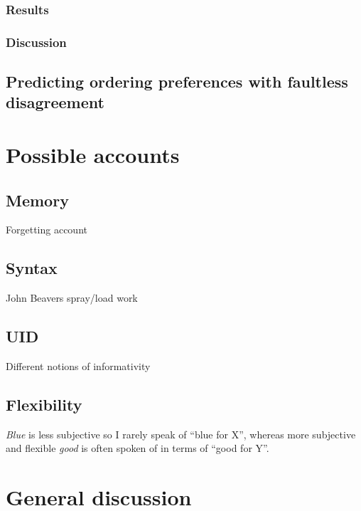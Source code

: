 \documentclass[11pt]{article}
\begin{document}
\subsubsection{Results}

\subsubsection{Discussion}


\subsection{Predicting ordering preferences with faultless disagreement}



\section{Possible accounts}


\subsection{Memory}

Forgetting account

\subsection{Syntax}

John Beavers spray/load work

\subsection{UID}

Different notions of informativity

\subsection{Flexibility}

\emph{Blue} is less subjective so I rarely speak of ``blue for X'', whereas more subjective and flexible \emph{good} is often spoken of in terms of ``good for Y''.


\section{General discussion}
\end{document}
